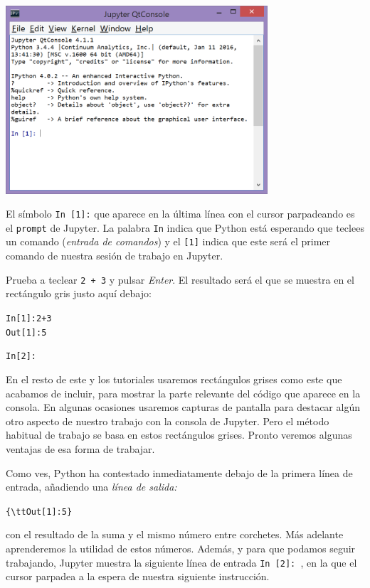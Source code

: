 \documentclass[10pt,a4paper]{article}\usepackage[]{graphicx}\usepackage[]{color}
\makeatletter
\newenvironment{kframe}{%
 \def\at@end@of@kframe{}%
 \ifinner\ifhmode%
  \def\at@end@of@kframe{\end{minipage}}%
  \begin{minipage}{\columnwidth}%
 \fi\fi%
 \def\FrameCommand##1{\hskip\@totalleftmargin \hskip-\fboxsep
 \colorbox{shadecolor}{##1}\hskip-\fboxsep
     \hskip-\linewidth \hskip-\@totalleftmargin \hskip\columnwidth}%
 \MakeFramed {\advance\hsize-\width
   \@totalleftmargin\z@ \linewidth\hsize
   \@setminipage}}%
 {\par\unskip\endMakeFramed%
 \at@end@of@kframe}
\newenvironment{knitrout}{}{} %
\newcounter {cont01}
\makeatother
\begin{document}
\begin{center}
\includegraphics[height=7cm]{../fig/Tut-02-py-01.png}
\end{center}

El símbolo {\tt In [1]:} que aparece en la última línea con el cursor parpadeando es el {\tt prompt} de Jupyter. La palabra {\tt In} indica que Python está esperando que teclees un comando ({\em entrada de comandos}) y el {\tt [1]} indica que este será el primer comando de nuestra sesión de trabajo en Jupyter.

Prueba a teclear {\tt 2 + 3} y pulsar {\em Enter}. El resultado será el que se muestra en el rectángulo gris justo aquí debajo:

\begin{knitrout}
\color{fgcolor}\begin{kframe}
\begin{alltt}
In [1]: 2 + 3
Out[1]: 5

In [2]:
\end{alltt}
\end{kframe}
\end{knitrout}
En el resto de este y los tutoriales usaremos rectángulos grises como este que acabamos de incluir, para mostrar la parte relevante del código que aparece en la consola. En algunas ocasiones usaremos capturas de pantalla para destacar algún otro aspecto de nuestro trabajo con la consola de Jupyter. Pero el método habitual de trabajo se basa en estos rectángulos grises. Pronto veremos algunas ventajas de esa forma de trabajar.

Como ves, Python ha contestado inmediatamente debajo de la primera línea de entrada, añadiendo una {\em línea de salida:}
\begin{knitrout}
\color{fgcolor}\begin{kframe}
\begin{alltt}
\{\textbackslash{}tt Out[1]: 5\}
\end{alltt}
\end{kframe}
\end{knitrout}
con el resultado de la suma y el mismo número entre corchetes. Más adelante aprenderemos la utilidad de estos números. Además, y para que podamos seguir trabajando, Jupyter muestra la siguiente línea de entrada {\tt In [2]: }, en la que el cursor parpadea a la espera de nuestra siguiente instrucción.
\end{document}
